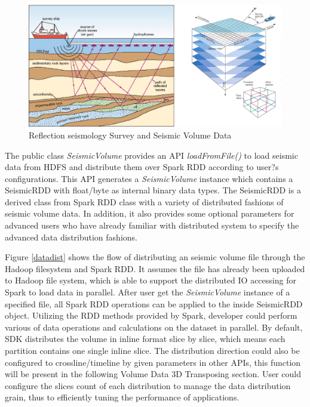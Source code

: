 \begin{figure}[h]
\centering
\includegraphics[scale=0.6]{figures/seisdata.png}
\caption{Reflection seismology Survey and Seismic Volume Data \cite{seisaov} \cite{seisinline}}
\label{seisdata}
\end{figure}

The public class \emph{SeismicVolume} provides an API \emph{loadFromFile()} to load seismic data from HDFS and distribute them over Spark RDD according to user?s configurations. This API generates a \emph{SeismicVolume} instance which contains a SeismicRDD with float/byte as internal binary data types. The SeismicRDD is a derived class from Spark RDD class with a variety of distributed fashions of seismic volume data. In addition, it also provides some optional parameters for advanced users who have already familiar with distributed system to specify the advanced data distribution fashions. 

Figure \ref{datadist} shows the flow of distributing an seismic volume file through the Hadoop filesystem and Spark RDD. It assumes the file has already been uploaded to Hadoop file system, which is able to support the distributed IO accessing for Spark to load data in parallel. After user get the  \emph{SeismicVolume} instance of a specified file,  all Spark RDD operations can be applied to the inside SeismicRDD object. Utilizing the RDD methods provided by Spark, developer could perform various of data operations and calculations on the dataset in parallel. By default, SDK distributes the volume in inline format slice by slice, which means each partition contains one single inline slice. The distribution direction could also be configured to crossline/timeline by given parameters in other APIs, this function will be present in the following Volume Data 3D Transposing section. User could configure the slices count of each distribution to manage the data distribution grain, thus to efficiently tuning the performance of applications.

